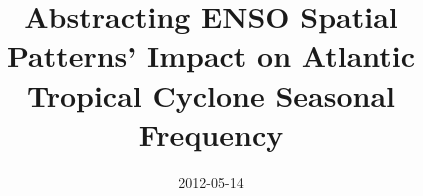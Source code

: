 \documentclass[]{article}
\title{Abstracting ENSO Spatial Patterns' Impact on Atlantic Tropical Cyclone Seasonal Frequency}
\author{  }
\date{2012-05-14}
\begin{document}
\maketitle

\end{document}
